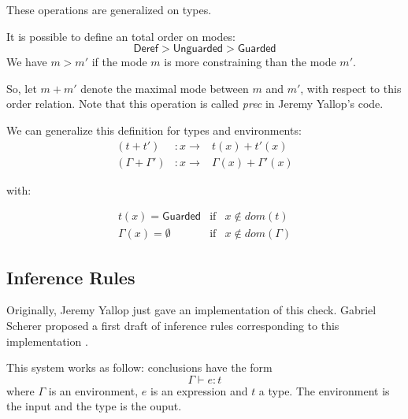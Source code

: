 \documentclass{article}
\newcommand{\Deref}{\mathsf{Deref}}
\newcommand{\Unguarded}{\mathsf{Unguarded}}
\newcommand{\Guarded}{\mathsf{Guarded}}
\begin{document}
These operations are generalized on types.


It is possible to define an total order on modes:
$$\Deref > \Unguarded > \Guarded$$
We have $m > m'$ if the mode $m$ is more constraining than the mode $m'$.

So, let $m + m'$ denote the maximal mode between $m$ and $m'$, with respect to
this order relation. Note that this operation is called \textit{prec} in
Jeremy Yallop's code.

We can generalize this definition for types and environments:
\begin{displaymath}
  \begin{array}{lll}
    (t + t')           & : x \rightarrow & t(x) + t'(x) \\
    (\Gamma + \Gamma') & : x \rightarrow & \Gamma(x) + \Gamma'(x)
  \end{array}
\end{displaymath}

with:

\begin{displaymath}
  \begin{array}{lll}
    t(x) = \Guarded       & \text{if} & x \notin dom(t) \\
    \Gamma(x) = \emptyset & \text{if} & x \notin dom(\Gamma)
  \end{array}
\end{displaymath}

\subsection{Inference Rules}
Originally, Jeremy Yallop just gave an implementation of this
check. Gabriel Scherer proposed a first draft of inference rules
corresponding to this implementation \cite{GascheComment1, GascheComment2}.

This system works as follow: conclusions have the form
$$\Gamma \vdash e: t$$
where $\Gamma$ is an environment, $e$ is an expression and $t$ a type. The
environment is the input and the type is the ouput.
\end{document}
